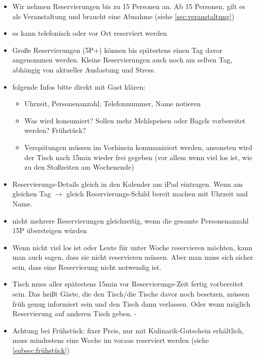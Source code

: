 \documentclass[a4paper,12pt]{article}
\newcounter{row}
\begin{document}
\begin{itemize}[topsep=0pt, itemsep=1pt, leftmargin=1em]
    \item[-] Wir nehmen Reservierungen bis zu 15 Personen an. Ab 15 Personen, gilt es als Veranstaltung und braucht eine Abnahme (siehe \cref{sec:veranstaltung})
    \item[-] es kann telefonisch oder vor Ort reserviert werden
    \item[-] Große Reservierungen (5P+) können bis spätestens einen Tag davor angenommen werden. Kleine Reservierungen auch noch am selben Tag, abhängig von aktueller Auslastung und Stress.
    \item[-] folgende Infos bitte direkt mit Gast klären:
    \begin{itemize}[topsep=0pt, itemsep=1pt]
        \item[-] Uhrzeit, Personenanzahl, Telefonnummer, Name notieren
        \item[-] Was wird konsumiert? Sollen mehr Mehlspeisen oder Bagels vorbereitet werden? Frühstück?
        \item[-] Verspätungen müssen im Vorhinein kommuniziert werden, ansonsten wird der Tisch nach 15min wieder frei gegeben (vor allem wenn viel los ist, wie zu den Stoßzeiten am Wochenende)
    \end{itemize}
    \item[-] Reservierungs-Details gleich in den Kalender am iPad eintragen. Wenn am gleichen Tag $\rightarrow$ gleich Reservierungs-Schild bereit machen mit Uhrzeit und Name.
    \item[-] nicht mehrere Reservierungen gleichzeitig, wenn die gesamte  Personenanzahl 15P übersteigen würden 
    \item[-] Wenn nicht viel los ist oder Leute für unter Woche reservieren möchten, kann man auch sagen, dass sie nicht reservieren müssen. Aber man muss sich sicher sein, dass eine Reservierung nicht notwendig ist.
    \item[-] Tisch muss aller spätestens 15min vor Reservierungs-Zeit fertig vorbereitet sein. Das heißt Gäste, die den Tisch/die Tische davor noch besetzen, müssen früh genug informiert sein und den Tisch dann verlassen. Oder wenn möglich Reservierung auf anderen Tisch geben.
    -\item[-] Achtung bei Frühstück: fixer Preis, nur mit Kulinarik-Gutschein erhältlich, muss mindestens eine Woche im voraus reserviert werden (siehe \cref{subsec:frühstück})
\end{itemize}
\end{document}
